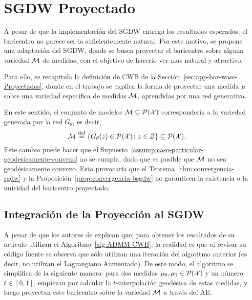 \section{SGDW Proyectado}\label{sec:sgdwp}  %

A pesar de que la implementación del SGDW entrega los resultados esperados, el baricentro no parece ser lo suficientemente natural. Por este motivo, se propone una adaptación del SGDW, donde se busca proyectar el baricentro sobre alguna variedad $\Manifold$ de medidas, con el objetivo de hacerlo ver más natural y atractivo.

Para ello, se recapitula la definición de CWB de la Sección~\ref{sec:app-bar-wass-Proyectados}, donde en el trabajo \cite{simon2020barycenters} se explica la forma de proyectar una medida $\mu$ sobre una variedad específica de medidas $\Manifold$, aprendidas por una red generativa.

En este sentido, el conjunto de modelos $\Manifold\subseteq \ProbSpace[\cX] $ correspondería a la variedad generada por la red $G_\theta$, es decir,
\begin{equation}
    \Manifold \eqdef \left\{ G_\theta(z) \in \ProbSpace[\cX] \colon z \in \cZ \right\} \subseteq \ProbSpace[\cX].
\end{equation}
Este cambio puede hacer que el Supuesto~\ref{assump:caso-particular-geodesicamente-convexo} no se cumpla, dado que es posible que $\Manifold$ no sea geodésicamente convexo. Esto provocaría que el Teorema~\ref{thm:convergencia-sgdw} y la Proposición~\ref{prop:convergencia-bsgdw} no garanticen la existencia o la unicidad del baricentro proyectado.





\subsection{Integración de la Proyección al SGDW}\label{ssec:sgdwp-deduccion-algoritmo}  %

A pesar de que los autores de \cite{simon2020barycenters} explican que, para obtener los resultados de su artículo utilizan el Algoritmo~\ref{alg:ADMM-CWB}, la realidad es que al revisar su código fuente \cite{imagebar2020simon} se observa que sólo utilizan una iteración del algoritmo anterior (es decir, no utilizan el Lagrangiano Aumentado). De este modo, el algoritmo se simplifica de la siguiente manera: para dos medidas $\mu_0, \mu_1 \in \ProbSpace[\cX] $ y un número $t \in [0, 1]$, empiezan por calcular la $t$-interpolación geodésica de estas medidas, y luego proyectan este baricentro sobre la variedad $\Manifold$ a través del AE.


